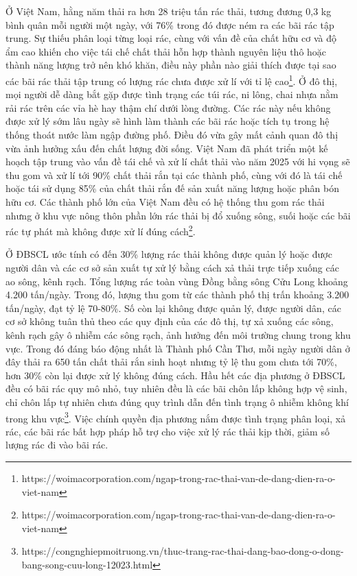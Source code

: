 \documentclass[../the.tex]{subfiles}
\begin{document}
{\fontsize{13}{12} \selectfont

Ở Việt Nam, hằng năm thải ra hơn 28 triệu tấn rác thải, tương đương 0,3 kg bình quân mỗi người một ngày, với 76\% trong đó được ném ra các bãi rác tập trung. Sự thiếu phân loại từng loại rác, cùng với vấn đề của chất hữu cơ và độ ẩm cao khiến cho việc tái chế chất thải hỗn hợp thành nguyên liệu thô hoặc thành năng lượng trở nên khó khăn, điều này phần nào giải thích được tại sao các bãi rác thải tập trung có lượng rác chưa được xử lí với tỉ lệ cao\footnote[1]{https://woimacorporation.com/ngap-trong-rac-thai-van-de-dang-dien-ra-o-viet-nam}. 
Ở đô thị, mọi người dễ dàng bắt gặp được tình trạng các túi rác, ni lông, chai nhựa nằm rải rác trên các vỉa hè hay thậm chí dưới lòng đường.
Các rác này nếu không được xử lý sớm lâu ngày sẽ hình làm thành các bãi rác hoặc tích tụ trong hệ thống thoát nước làm ngập đường phố.
Điều đó vừa gây mất cảnh quan đô thị vừa ảnh hưởng xấu đến chất lượng đời sống. 
Việt Nam đã phát triển một kế hoạch tập trung vào vấn đề tái chế và xử lí chất thải vào năm 2025 với hi vọng sẽ thu gom và xử lí tới 90\% chất thải rắn tại các thành phố, cùng với đó là tái chế hoặc tái sử dụng 85\% của chất thải rắn đế sản xuất năng lượng hoặc phân bón hữu cơ.
Các thành phố lớn của Việt Nam đều có hệ thống thu gom rác thải nhưng ở khu vực nông thôn phần lớn rác thải bị đổ xuống sông, suối hoặc các bãi rác tự phát mà không được xử lí đúng cách\footnote[2]{https://woimacorporation.com/ngap-trong-rac-thai-van-de-dang-dien-ra-o-viet-nam}. 

}

\bigskip

{\fontsize{13}{12} \selectfont

Ở ĐBSCL ước tính có đến 30\% lượng rác thải không được quản lý hoặc được người dân và các cơ sở sản xuất tự xử lý bằng cách xả thải trực tiếp xuống các ao sông, kênh rạch.
Tổng lượng rác toàn vùng Đồng bằng sông Cửu Long khoảng 4.200 tấn/ngày. Trong đó, lượng thu gom từ các thành phố thị trấn khoảng 3.200 tấn/ngày, đạt tỷ lệ 70-80\%. Số còn lại không được quản lý, được người dân, các cơ sở không tuân thủ theo các quy định của các đô thị, tự xả xuống các sông, kênh rạch gây ô nhiễm các sông rạch, ảnh hưởng đến môi trường chung trong khu vực.
Trong đó đáng báo động nhất là Thành phố Cần Thơ, mỗi ngày người dân ở đây thải ra 650 tấn chất thải rắn sinh hoạt nhưng tỷ lệ thu gom chưa tới 70\%, hơn 30\% còn lại được xử lý không đúng cách.
Hầu hết các địa phương ở ĐBSCL đều có bãi rác quy mô nhỏ, tuy nhiên đều là các bãi chôn lấp không hợp vệ sinh, chỉ chôn lấp tự nhiên chưa đúng quy trình dẫn đến tình trạng ô nhiễm không khí trong khu vực\footnote[1]{https://congnghiepmoitruong.vn/thuc-trang-rac-thai-dang-bao-dong-o-dong-bang-song-cuu-long-12023.html}.
Việc chính quyền địa phương nắm được tình trạng phân loại, xả rác, các bãi rác bất hợp pháp hỗ trợ cho việc xử lý rác thải kịp thời, giảm số lượng rác đi vào bãi rác. 

}
\end{document}
